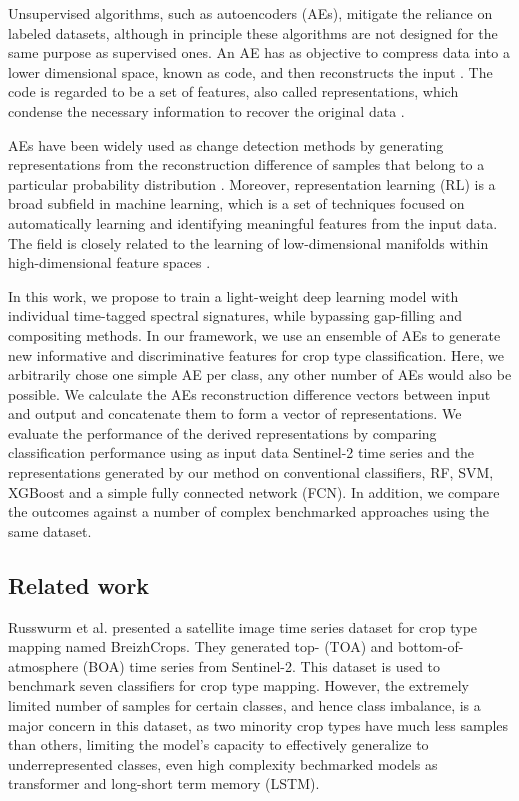 \documentclass[journal,article,submit,pdftex,moreauthors]{Definitions/mdpi}
\begin{document}
Unsupervised algorithms, such as autoencoders (AEs), mitigate the reliance on labeled datasets, although in principle these algorithms 
are not designed for the same purpose as supervised ones. An AE has as objective to compress data into a lower dimensional 
space, known as code, and then reconstructs the input \cite{ML2023}.  The code is regarded to be a set of features, also called representations, 
which condense the necessary information to recover the original data \cite{LopezPinaya2020}.

AEs have been widely used as change detection methods by generating representations from the reconstruction difference of 
samples that belong to a particular probability distribution \cite{LopezFandino2018,Luppino2024,Kalinicheva2019}. 
Moreover, representation learning (RL) is a broad subfield in machine learning, which is a set of techniques focused on 
automatically learning and identifying meaningful features from the input data. The field is closely related to the learning of low-dimensional manifolds within high-dimensional feature spaces
\cite{Swope2021, Bengio2013, Neumann2019, Li2022, Bengio2012, Engelen2019, Ericsson2022}.

In this work, we propose to train a light-weight deep learning model with individual time-tagged spectral signatures, while bypassing gap-filling and compositing methods.
In our framework, we use an ensemble of \ac{AEs} to generate new informative and discriminative features for crop type classification. 
Here, we arbitrarily chose one simple AE per class, any other number of \ac{AEs} would also be possible.
We calculate the \ac{AEs} reconstruction difference vectors between input and output and concatenate them to form a vector of representations. 
We evaluate the performance of the derived representations by comparing classification performance using as input data Sentinel-2 time series and the representations generated by our method on conventional classifiers, RF, SVM, XGBoost and a simple fully connected network (FCN). In addition, we compare the outcomes against a number of complex benchmarked approaches using the same dataset.

\subsection{Related work}
Russwurm et al. \cite{Russwurm2020} presented a satellite image time series dataset for crop type mapping named BreizhCrops. They generated top- (TOA) and bottom-of-atmosphere (BOA) time series from Sentinel-2. This dataset is used to benchmark seven classifiers 
for crop type mapping. 
However, the extremely limited number of samples for certain classes, and hence class imbalance, is a major concern in this dataset, as two minority crop types have much less samples than others, limiting the model's capacity to effectively generalize to underrepresented classes, even high complexity bechmarked models as transformer and long-short term memory (LSTM).
\end{document}
